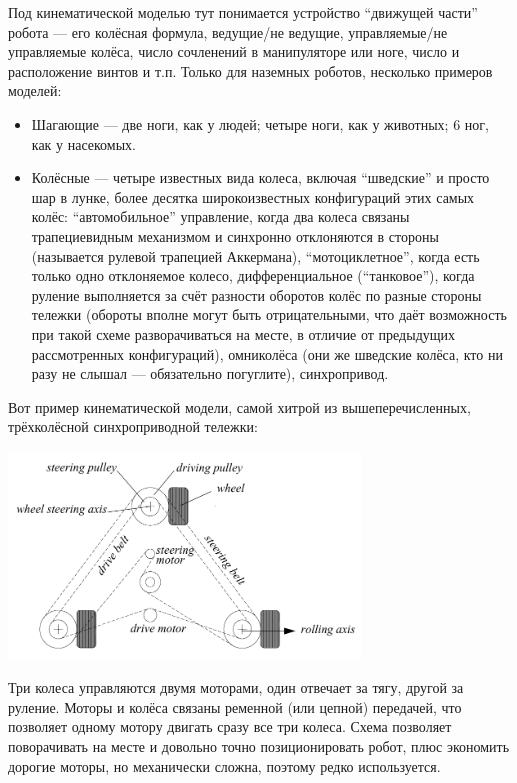 \documentclass{../../text-style}
\begin{document}
Под кинематической моделью тут понимается устройство \enquote{движущей части} робота --- его колёсная формула, ведущие/не ведущие, управляемые/не управляемые колёса, число сочленений в манипуляторе или ноге, число и расположение винтов и т.п.
Только для наземных роботов, несколько примеров моделей:

\begin{itemize}
    \item Шагающие --- две ноги, как у людей; четыре ноги, как у животных; 6 ног, как у насекомых.
    \item Колёсные --- четыре известных вида колеса, включая \enquote{шведские} и просто шар в лунке, более десятка широкоизвестных конфигураций этих самых колёс: \enquote{автомобильное} управление, когда два колеса связаны трапециевидным механизмом и синхронно отклоняются в стороны (называется рулевой трапецией Аккермана), \enquote{мотоциклетное}, когда есть только одно отклоняемое колесо, дифференциальное (\enquote{танковое}), когда руление выполняется за счёт разности оборотов колёс по разные стороны тележки (обороты вполне могут быть отрицательными, что даёт возможность при такой схеме разворачиваться на месте, в отличие от предыдущих рассмотренных конфигураций), омниколёса (они же шведские колёса, кто ни разу не слышал --- обязательно погуглите), синхропривод.
\end{itemize}

Вот пример кинематической модели, самой хитрой из вышеперечисленных, трёхколёсной синхроприводной тележки:

\begin{center}
    \includegraphics[width=0.7\textwidth]{synchroDrive.png}
\end{center}

Три колеса управляются двумя моторами, один отвечает за тягу, другой за руление.
Моторы и колёса связаны ременной (или цепной) передачей, что позволяет одному мотору двигать сразу все три колеса.
Схема позволяет поворачивать на месте и довольно точно позиционировать робот, плюс экономить дорогие моторы, но механически сложна, поэтому редко используется.
\end{document}
